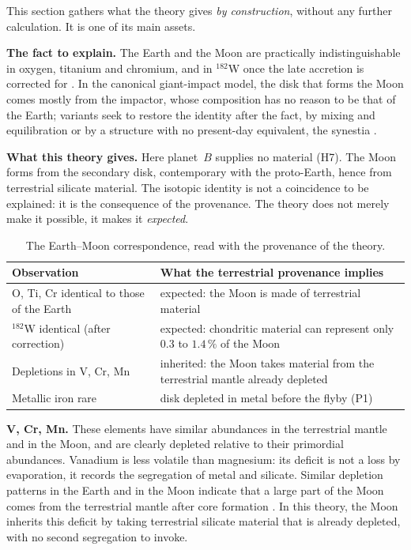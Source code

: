 \documentclass[11pt,a4paper]{article}
\begin{document}
This section gathers what the theory gives \emph{by construction}, without any further calculation. It is one of its main assets.

\textbf{The fact to explain.} The Earth and the Moon are practically indistinguishable in oxygen, titanium and chromium, and in $^{182}$W once the late accretion is corrected for \citep{Young2016,Zhang2012,Dauphas2017,Kruijer2015,Touboul2015}. In the canonical giant-impact model, the disk that forms the Moon comes mostly from the impactor, whose composition has no reason to be that of the Earth; variants seek to restore the identity after the fact, by mixing and equilibration \citep{PahlevanStevenson2007} or by a structure with no present-day equivalent, the synestia \citep{Lock2018}.

\textbf{What this theory gives.} Here planet~$B$ supplies no material (H7). The Moon forms from the secondary disk, contemporary with the proto-Earth, hence from terrestrial silicate material. The isotopic identity is not a coincidence to be explained: it is the consequence of the provenance. The theory does not merely make it possible, it makes it \emph{expected}.

\begin{table}[htbp]
\centering
\caption{The Earth--Moon correspondence, read with the provenance of the theory.\label{tab:isotopes}}
\small
\begin{tabular}{>{\raggedright\arraybackslash}p{4.4cm}>{\raggedright\arraybackslash}p{10.4cm}}
\toprule
Observation & What the terrestrial provenance implies \\
\midrule
O, Ti, Cr identical to those of the Earth & expected: the Moon is made of terrestrial material \\
$^{182}$W identical (after correction) & expected: chondritic material can represent only $0.3$ to $1.4\,\%$ of the Moon \\
Depletions in V, Cr, Mn & inherited: the Moon takes material from the terrestrial mantle already depleted \\
Metallic iron rare & disk depleted in metal before the flyby (P1) \\
\bottomrule
\end{tabular}
\end{table}

\textbf{V, Cr, Mn.} These elements have similar abundances in the terrestrial mantle and in the Moon, and are clearly depleted relative to their primordial abundances. Vanadium is less volatile than magnesium: its deficit is not a loss by evaporation, it records the segregation of metal and silicate. Similar depletion patterns in the Earth and in the Moon indicate that a large part of the Moon comes from the terrestrial mantle after core formation \citep{Drake1989,Ringwood1990,Gessmann2000}. In this theory, the Moon inherits this deficit by taking terrestrial silicate material that is already depleted, with no second segregation to invoke.
\end{document}
